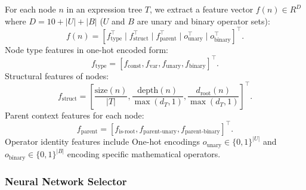 \documentclass{article}
\begin{document}
For each node $n$ in an expression tree $T$, we extract a feature vector ${f}(n) \in {R}^{D}$ where $D = 10 + |{U}| + |{B}|$ (${U}$ and ${B}$ are unary and binary operator sets):
\begin{equation}
{f}(n) = [{f}_{\text{type}}^\top \mid {f}_{\text{struct}}^\top \mid {f}_{\text{parent}}^\top \mid {o}_{\text{unary}}^\top \mid {o}_{\text{binary}}^\top]^\top.
\end{equation}
Node type features in one-hot encoded form:
\begin{equation}
{f}_{\text{type}} = [f_{\text{const}}, f_{\text{var}}, f_{\text{unary}}, f_{\text{binary}}]^\top.
\end{equation}
Structural features of nodes:
\begin{equation}
{f}_{\text{struct}} = \left[\frac{\text{size}(n)}{|T|}, \frac{\text{depth}(n)}{\max(d_T, 1)}, \frac{d_{\text{root}}(n)}{\max(d_T, 1)}\right]^\top.
\end{equation}
Parent context features for each node:
\begin{equation}
{f}_{\text{parent}} = [f_{\text{is-root}}, f_{\text{parent-unary}}, f_{\text{parent-binary}}]^\top.
\end{equation}
Operator identity features include One-hot
encodings ${o}_{\text{unary}} \in \{0,1\}^{|{U}|}$ and ${o}_{\text{binary}} \in \{0,1\}^{|{B}|}$ encoding specific mathematical operators.

\subsubsection*{Neural Network Selector}
\end{document}

